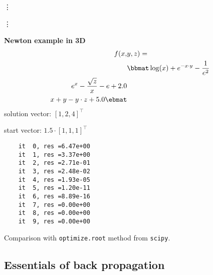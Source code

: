 \begin{minipage}[c]{0.6\textwidth}
	
	\vspace{-0.25cm}
	\centerline{\vdots}
	\vspace{-0.25cm}
	
	\vspace{-0.25cm}
	\centerline{\vdots}
	\vspace{-0.25cm}
	
\end{minipage}
\begin{minipage}[c]{0.05\textwidth}
\end{minipage}
\begin{minipage}[c]{0.35\textwidth}
	{\bf Newton example in 3D}
	\begin{align*}
	f(x,&y,z)=\\
	&\bbmat
	\log(x) + e^{-x\cdot y} - \frac{1}{e^2}\\
	e^{x} - \frac{\sqrt{z}}{x} - e + 2.0\\
	x + y - y\cdot z + 5.0
	\ebmat
	\end{align*}
	solution vector: $[1,2,4]^\top$
	
	start vector: $1.5\cdot[1,1,1]^\top$
	
	\begin{verbatim}
	it  0, res =6.47e+00
	it  1, res =3.37e+00
	it  2, res =2.71e-01
	it  3, res =2.48e-02
	it  4, res =1.93e-05
	it  5, res =1.20e-11
	it  6, res =8.89e-16
	it  7, res =0.00e+00
	it  8, res =0.00e+00
	it  9, res =0.00e+00
	\end{verbatim}
	
	Comparison with {\tt optimize.root} method from {\tt scipy}.
	
	\vspace{0.25cm}
	
\end{minipage}


\newpage
\subsection{Essentials of back propagation}

